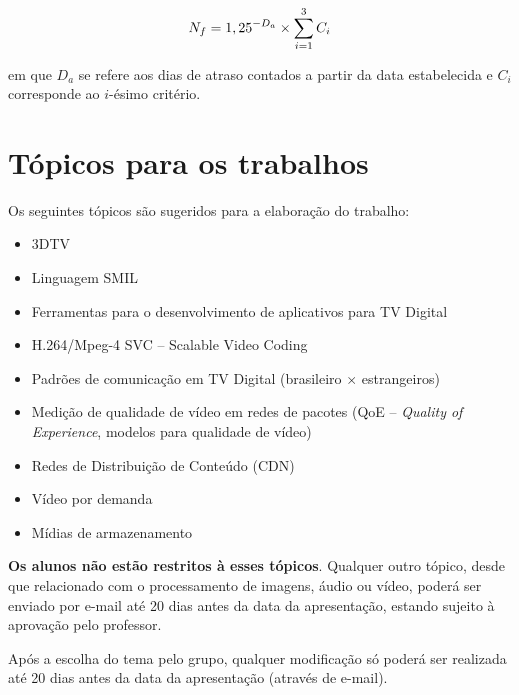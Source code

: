 \documentclass[a4paper,11pt]{article}
\begin{document}
\begin{equation}\label{eq:nota}
N_f = \displaystyle 1,25^{-D_a} \times \sum_{i = 1}^3 C_i
\end{equation}

\noindent em que $D_a$ se refere aos dias de atraso contados a partir da data
estabelecida e $C_i$ corresponde ao $i$-ésimo critério.

\section*{Tópicos para os trabalhos}

Os seguintes tópicos são sugeridos para a elaboração do trabalho:

\begin{itemize}
    \item 3DTV
    \item Linguagem SMIL
    \item Ferramentas para o desenvolvimento de aplicativos para TV Digital
    \item H.264/Mpeg-4 SVC – Scalable Video Coding
    \item Padrões de comunicação em TV Digital (brasileiro $\times$
          estrangeiros)
    \item Medição de qualidade de vídeo em redes de pacotes (QoE -- {\it Quality
          of Experience}, modelos para qualidade de vídeo)
    \item Redes de Distribuição de Conteúdo (CDN)
    \item Vídeo por demanda
    \item Mídias de armazenamento
\end{itemize}

{\bf Os alunos não estão restritos à esses tópicos}. Qualquer outro tópico,
desde que relacionado com o processamento de imagens, áudio ou vídeo, poderá ser
enviado por e-mail até 20 dias antes da data da apresentação, estando sujeito à
aprovação pelo professor.

Após a escolha do tema pelo grupo, qualquer modificação só poderá ser realizada
até 20 dias antes da data da apresentação (através de e-mail).
\end{document}
